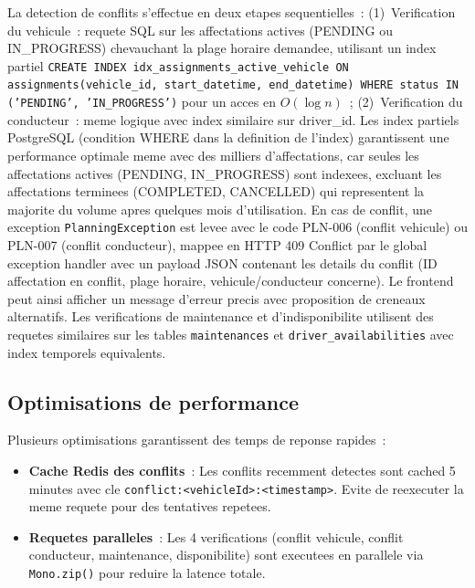 \documentclass[12pt,a4paper]{report}
\begin{document}
\begin{enumerate}[leftmargin=2cm]
\begin{lecture}
La detection de conflits s'effectue en deux etapes sequentielles~:
(1)~Verification du vehicule~: requete SQL sur les affectations actives
(PENDING ou IN\_PROGRESS) chevauchant la plage horaire demandee, utilisant
un index partiel \texttt{CREATE INDEX idx\_assignments\_active\_vehicle
ON assignments(vehicle\_id, start\_datetime, end\_datetime) WHERE status
IN ('PENDING', 'IN\_PROGRESS')} pour un acces en $O(\log n)$~;
(2)~Verification du conducteur~: meme logique avec index similaire sur
driver\_id. Les index partiels PostgreSQL (condition WHERE dans la definition
de l'index) garantissent une performance optimale meme avec des milliers
d'affectations, car seules les affectations actives (PENDING, IN\_PROGRESS)
sont indexees, excluant les affectations terminees (COMPLETED, CANCELLED)
qui representent la majorite du volume apres quelques mois d'utilisation.
En cas de conflit, une exception \texttt{PlanningException} est levee
avec le code PLN-006 (conflit vehicule) ou PLN-007 (conflit conducteur),
mappee en HTTP 409 Conflict par le global exception handler avec un payload
JSON contenant les details du conflit (ID affectation en conflit, plage
horaire, vehicule/conducteur concerne). Le frontend peut ainsi afficher
un message d'erreur precis avec proposition de creneaux alternatifs.
Les verifications de maintenance et d'indisponibilite utilisent des requetes
similaires sur les tables \texttt{maintenances} et \texttt{driver\_availabilities}
avec index temporels equivalents.
\end{lecture}

\subsection{Optimisations de performance}

Plusieurs optimisations garantissent des temps de reponse rapides~:

\begin{itemize}[leftmargin=2cm]
  \item \textbf{Cache Redis des conflits}~: Les conflits recemment detectes
        sont cached 5 minutes avec cle \texttt{conflict:<vehicleId>:<timestamp>}.
        Evite de reexecuter la meme requete pour des tentatives repetees.
        
  \item \textbf{Requetes paralleles}~: Les 4 verifications (conflit vehicule,
        conflit conducteur, maintenance, disponibilite) sont executees
        en parallele via \texttt{Mono.zip()} pour reduire la latence totale.
        

\end{itemize}
\end{enumerate}
\end{document}
